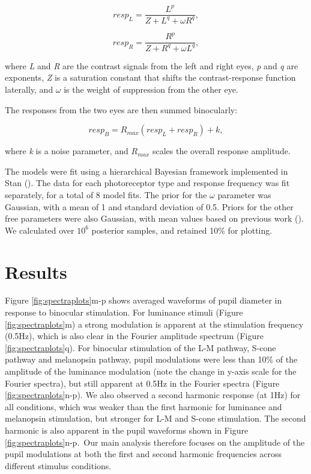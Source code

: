 \documentclass[
]{article}
\begin{document}
\begin{equation}
\label{eq:respL}
resp_L = \frac{L^p}{Z + L^q + \omega R^q},
\end{equation}

\begin{equation}
\label{eq:respR}
resp_R = \frac{R^p}{Z + R^q + \omega L^q},
\end{equation}

\noindent where \emph{L} and \emph{R} are the contrast signals from the left and right eyes, \emph{p} and \emph{q} are exponents, \emph{Z} is a saturation constant that shifts the contrast-response function laterally, and \(\omega\) is the weight of suppression from the other eye.

The responses from the two eyes are then summed binocularly:

\begin{equation}
\label{eq:respB}
resp_B = R_{max}(resp_L + resp_R) + k,
\end{equation}

\noindent where \emph{k} is a noise parameter, and \(R_{max}\) scales the overall response amplitude.

The models were fit using a hierarchical Bayesian framework implemented in Stan (). The data for each photoreceptor type and response frequency was fit separately, for a total of 8 model fits. The prior for the \(\omega\) parameter was Gaussian, with a mean of 1 and standard deviation of 0.5. Priors for the other free parameters were also Gaussian, with mean values based on previous work (). We calculated over \ensuremath{10^{6}} posterior samples, and retained 10\% for plotting.

\section{Results}\label{results}

Figure \ref{fig:spectraplots}m-p shows averaged waveforms of pupil diameter in response to binocular stimulation. For luminance stimuli (Figure \ref{fig:spectraplots}m) a strong modulation is apparent at the stimulation frequency (0.5Hz), which is also clear in the Fourier amplitude spectrum (Figure \ref{fig:spectraplots}q). For binocular stimulation of the L-M pathway, S-cone pathway and melanopsin pathway, pupil modulations were less than 10\% of the amplitude of the luminance modulation (note the change in y-axis scale for the Fourier spectra), but still apparent at 0.5Hz in the Fourier spectra (Figure \ref{fig:spectraplots}n-p). We also observed a second harmonic response (at 1Hz) for all conditions, which was weaker than the first harmonic for luminance and melanopsin stimulation, but stronger for L-M and S-cone stimulation. The second harmonic is also apparent in the pupil waveforms shown in Figure \ref{fig:spectraplots}n-p.~Our main analysis therefore focuses on the amplitude of the pupil modulations at both the first and second harmonic frequencies across different stimulus conditions.
\end{document}
